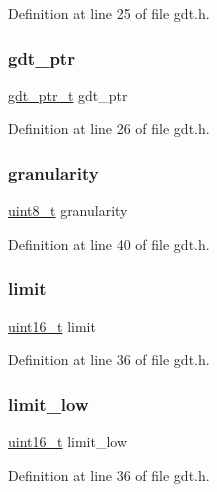 Definition at line 25 of file gdt.\+h.

\mbox{\label{a00068_ab0888c07dfb9352ef76d05e63464cf0b_ab0888c07dfb9352ef76d05e63464cf0b}} 
\subsubsection{\texorpdfstring{gdt\+\_\+ptr}{gdt\_ptr}}
{\footnotesize\ttfamily \hyperlink{a00068_a3bf3fa6f397bda8399e1afb6283b66ca_a3bf3fa6f397bda8399e1afb6283b66ca}{gdt\+\_\+ptr\+\_\+t} gdt\+\_\+ptr}



Definition at line 26 of file gdt.\+h.

\mbox{\label{a00068_acfea365f69e71368a2db03333d4afd6f_acfea365f69e71368a2db03333d4afd6f}} 
\subsubsection{\texorpdfstring{granularity}{granularity}}
{\footnotesize\ttfamily \hyperlink{a00101_aba7bc1797add20fe3efdf37ced1182c5_aba7bc1797add20fe3efdf37ced1182c5}{uint8\+\_\+t} granularity}



Definition at line 40 of file gdt.\+h.

\mbox{\label{a00068_ab28e82ae69032cb4ad3ec3a0be3d7129_ab28e82ae69032cb4ad3ec3a0be3d7129}} 
\subsubsection{\texorpdfstring{limit}{limit}}
{\footnotesize\ttfamily \hyperlink{a00101_a273cf69d639a59973b6019625df33e30_a273cf69d639a59973b6019625df33e30}{uint16\+\_\+t} limit}



Definition at line 36 of file gdt.\+h.

\mbox{\label{a00068_aa7ae5b5a918e00776ff07fb1c58a348d_aa7ae5b5a918e00776ff07fb1c58a348d}} 
\subsubsection{\texorpdfstring{limit\+\_\+low}{limit\_low}}
{\footnotesize\ttfamily \hyperlink{a00101_a273cf69d639a59973b6019625df33e30_a273cf69d639a59973b6019625df33e30}{uint16\+\_\+t} limit\+\_\+low}



Definition at line 36 of file gdt.\+h.

